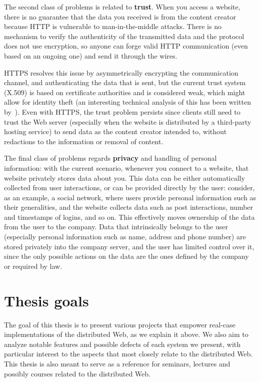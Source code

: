 \documentclass[mscthesis]{usiinfthesis}
\begin{document}
The second class of problems is related to \textbf{trust}. When you access a website, there is no guarantee that the data you received is from the content creator because HTTP is vulnerable to man-in-the-middle attacks. There is no mechanism to verify the authenticity of the transmitted data and the protocol does not use encryption, so anyone can forge valid HTTP communication (even based on an ongoing one) and send it through the wires.

HTTPS resolves this issue by asymmetrically encrypting the communication channel, and authenticating the data that is sent, but the current trust system (X.509) is based on certificate authorities and is considered weak, which might allow for identity theft (an interesting technical analysis of this has been written by~\cite{webarticle:httpssecurity}). Even with HTTPS, the trust problem persists since clients still need to trust the Web server (especially when the website is  distributed by a third-party hosting service) to send data as the content creator intended to, without redactions to the information or removal of content.

The final class of problems regards \textbf{privacy} and handling of personal information: with the current scenario, whenever you connect to a website, that website privately stores data about you.
This data can be either automatically collected from user interactions, or can be provided directly by the user: consider, as an example, a social network, where users provide personal information such as their generalities, and the website collects data such as post interactions, number and timestamps of logins, and so on.
This effectively moves ownership of the data from the user to the company. Data that intrinsically belongs to the user (especially personal information such as name, address and phone number) are stored privately into the company server, and the user has limited control over it, since the only possible actions on the data are the ones defined by the company or required by law.

\section{Thesis goals}
The goal of this thesis is to present various projects that empower real-case implementations of the distributed Web, as we explain it above. We also aim to analyze notable features and possible defects of each system we present, with particular interest to the aspects that most closely relate to the distributed Web. This thesis is also meant to serve as a reference for seminars, lectures and possibly courses related to the distributed Web.
\end{document}
